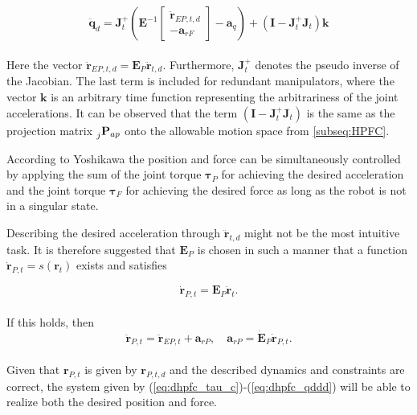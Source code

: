 \begin{equation}\label{eq:dhpfc_qddd}
    \ddot{\mathbf{q}}_d = \mathbf{J}_t^+ (\mathbf{E}^{-1} 
    \begin{bmatrix}
        \mathbf{\ddot{r}}_{EP,t,d} \\
        - \mathbf{a}_{rF}
    \end{bmatrix}
    - \mathbf{a}_q) + (\mathbf{I}-  \mathbf{J}_t^+ \mathbf{J}_t)\mathbf{k}
\end{equation}
\\
Here the vector $\mathbf{\ddot{r}}_{EP,t,d} = \mathbf{E}_P \mathbf{\ddot{r}}_{t,d}$. Furthermore, $\mathbf{J}_t^+$ denotes the pseudo inverse of the Jacobian.
The last term is included for redundant manipulators, where the vector $\mathbf{k}$ is an arbitrary time function representing the arbitrariness of the joint accelerations. It can be observed that the term $ (\mathbf{I}-  \mathbf{J}_t^+ \mathbf{J}_t)$ is the same as the projection matrix $\prescript{}{j}{\mathbf{P}}_{ap}$ onto the allowable motion space from \ref{subseq:HPFC}.

According to Yoshikawa \cite{yoshikawa1987dynamic} the position and force can be simultaneously controlled by applying the sum of the joint torque $\boldsymbol{\tau}_P$ for achieving the desired acceleration and the joint torque $\boldsymbol{\tau}_F$ for achieving the desired force as long as the robot is not in a singular state.

Describing the desired acceleration through $\mathbf{\ddot{r}}_{t,d}$ might not be the most intuitive task. It is therefore suggested that $\mathbf{E}_P$ is chosen in such a manner that a function $\mathbf{\dot{r}}_{P,t} = s(\mathbf{r}_t)$ exists and satisfies

\begin{equation}
    \mathbf{\dot{r}}_{P,t} = \mathbf{E}_P \mathbf{\dot{r}}_t.
\end{equation}
\\
If this holds, then
\begin{equation}
    \mathbf{\ddot{r}}_{P,t} = \mathbf{\ddot{r}}_{EP,t} + \mathbf{a}_{rP}, \quad \mathbf{a}_{rP} = \mathbf{\dot{E}}_P \mathbf{\dot{r}}_{P,t}.
\end{equation}
\\
Given that $\mathbf{r}_{P,t}$ is given by $\mathbf{r}_{P,t,d}$ and the described dynamics and constraints are correct, the system given by (\ref{eq:dhpfc_tau_c})-(\ref{eq:dhpfc_qddd}) will be able to realize both the desired position and force.

